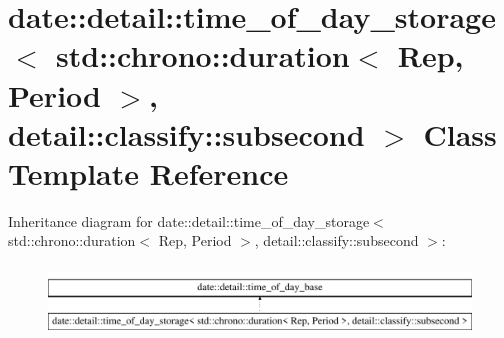 \hypertarget{classdate_1_1detail_1_1time__of__day__storage_3_01std_1_1chrono_1_1duration_3_01_rep_00_01_period1e03169a7045e50b0409508214ed655}{}\section{date\+::detail\+::time\+\_\+of\+\_\+day\+\_\+storage$<$ std\+::chrono\+::duration$<$ Rep, Period $>$, detail\+::classify\+::subsecond $>$ Class Template Reference}
\label{classdate_1_1detail_1_1time__of__day__storage_3_01std_1_1chrono_1_1duration_3_01_rep_00_01_period1e03169a7045e50b0409508214ed655}
Inheritance diagram for date\+::detail\+::time\+\_\+of\+\_\+day\+\_\+storage$<$ std\+::chrono\+::duration$<$ Rep, Period $>$, detail\+::classify\+::subsecond $>$\+:\begin{figure}[H]
\begin{center}
\leavevmode
\includegraphics[height=1.904762cm]{classdate_1_1detail_1_1time__of__day__storage_3_01std_1_1chrono_1_1duration_3_01_rep_00_01_period1e03169a7045e50b0409508214ed655}
\end{center}
\end{figure}
